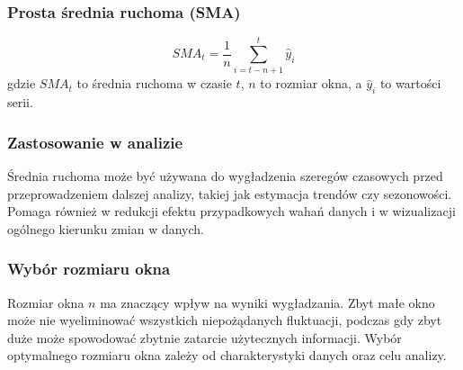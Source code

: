 \documentclass{article}
\begin{document}
\subsubsection{Prosta średnia ruchoma (SMA)}
\[SMA_t = \frac{1}{n}\sum_{i=t-n+1}^{t}\hat{y}_i\]
gdzie \(SMA_t\) to średnia ruchoma w czasie \(t\), \(n\) to rozmiar okna, a \(\hat{y}_i\) to wartości serii.


\subsubsection{Zastosowanie w analizie}
Średnia ruchoma może być używana do wygładzenia szeregów czasowych przed przeprowadzeniem dalszej analizy, takiej jak estymacja trendów czy sezonowości. Pomaga również w redukcji efektu przypadkowych wahań danych i w wizualizacji ogólnego kierunku zmian w danych.

\subsubsection{Wybór rozmiaru okna}
Rozmiar okna \(n\) ma znaczący wpływ na wyniki wygładzania. Zbyt małe okno może nie wyeliminować wszystkich niepożądanych fluktuacji, podczas gdy zbyt duże może spowodować zbytnie zatarcie użytecznych informacji. Wybór optymalnego rozmiaru okna zależy od charakterystyki danych oraz celu analizy.
\end{document}

